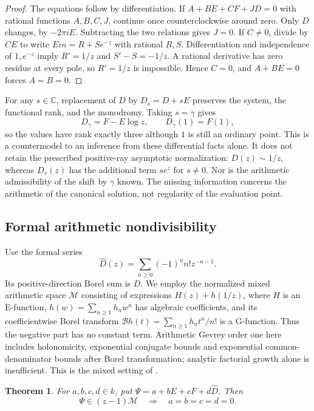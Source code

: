 \documentclass[11pt,a4paper]{article}
\newtheorem{theorem}{Theorem}[section]
\theoremstyle{definition}
\theoremstyle{remark}
\theoremstyle{plain}
\numberwithin{equation}{section}
\def\operatorname#1{#1}\def\mathrm#1{#1}}
\providecommand{\rcEin}{\operatorname{Ein}}
\providecommand{\rcC}{\mathbb C}
\providecommand{\rcM}{\mathcal M}
\begin{document}
\begin{proof}
The equations follow by differentiation.  If
$A+BE+CF+JD=0$ with rational functions $A,B,C,J$, continue once
counterclockwise around zero.  Only $D$ changes, by $-2\pi iE$.
Subtracting the two relations gives $J=0$.  If $C\ne0$, divide by $CE$
to write $\rcEin=R+Se^{-z}$ with rational $R,S$.  Differentiation and
independence of $1,e^{-z}$ imply $R'=1/z$ and $S'-S=-1/z$.
A rational derivative has zero residue at every pole, so $R'=1/z$ is
impossible.  Hence $C=0$, and $A+BE=0$ forces $A=B=0$.
\end{proof}

For any $s\in\rcC$, replacement of $D$ by $D_s=D+sE$ preserves the
system, the functional rank, and the monodromy.  Taking $s=\gamma$ gives
\begin{equation}\label{rc:eq:shift-countermodel}
 D_\gamma=F-E\log z,\qquad D_\gamma(1)=F(1),
\end{equation}
so the values have rank exactly three although $1$ is still an ordinary
point.  This is a countermodel to an inference from these differential
facts alone.  It does not retain the prescribed positive-ray asymptotic
normalization: $D(z)\sim1/z$, whereas $D_s(z)$ has the additional term
$se^z$ for $s\ne0$.  Nor is the arithmetic admissibility of the shift
by $\gamma$ known.  The missing information concerns the arithmetic of
the canonical solution, not regularity of the evaluation point.

\subsection{Formal arithmetic nondivisibility}

Use the formal series
\[
 \widehat D(z)=\sum_{n\ge0}(-1)^n n!z^{-n-1}.
\]
Its positive-direction Borel sum is $D$.  We employ the normalized mixed
arithmetic space $\rcM$ consisting of expressions
$H(z)+h(1/z)$, where $H$ is an E-function, $h(w)=\sum_{n\ge1}h_nw^n$
has algebraic coefficients, and its coefficientwise Borel transform
$\mathcal B h(t)=\sum_{n\ge1}h_nt^n/n!$ is a G-function.  Thus the
negative part has no constant term.  Arithmetic Gevrey order one here
includes holonomicity, exponential conjugate bounds and exponential
common-denominator bounds after Borel transformation; analytic factorial
growth alone is insufficient.  This is the mixed setting of
\cite[Definition 1 and \S2]{FRmixed}.

\begin{theorem}\label{rc:thm:nondivision}
For $a,b,c,d\in k$, put
$\Psi=a+bE+cF+d\widehat D$.  Then
\begin{equation}\label{rc:eq:nondivision}
 \Psi\in(z-1)\rcM\quad\Longrightarrow\quad a=b=c=d=0.
\end{equation}
\end{theorem}
\end{document}
